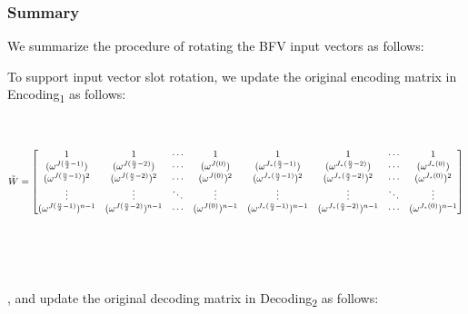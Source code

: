 \subsubsection{Summary}
\label{subsubsec:bfv-rotation-summary}

We summarize the procedure of rotating the BFV input vectors as follows: 

\begin{tcolorbox}[title={\textbf{\tboxlabel{\ref*{subsec:bfv-rotation}} BFV's Homomorphic Rotation of Input Vector Slots}}]

To support input vector slot rotation, we update the original encoding matrix in \textsf{Encoding\textsubscript{1}} as follows: 

$ $

{\footnotesize{\noindent $\tilde{W} = \begin{bmatrix}
1 & 1 & \cdots & 1 & 1 & 1 & \cdots & 1\\
(\omega^{J(\frac{n}{2} - 1)}) & (\omega^{J(\frac{n}{2} - 2)}) & \cdots & (\omega^{J(0)}) & (\omega^{J_*(\frac{n}{2} - 1)}) & (\omega^{J_*(\frac{n}{2} - 2)}) & \cdots & (\omega^{J_*(0)})\\
(\omega^{J(\frac{n}{2} - 1)})^2 & (\omega^{J(\frac{n}{2} - 2)})^2 & \cdots & (\omega^{J(0)})^2 & (\omega^{J_*(\frac{n}{2} - 1)})^2 & (\omega^{J_*(\frac{n}{2} - 2)})^2 & \cdots & (\omega^{J_*(0)})^2 \\
\vdots & \vdots & \ddots & \vdots & \vdots & \vdots & \ddots & \vdots \\
(\omega^{J(\frac{n}{2} - 1)})^{n-1} & (\omega^{J(\frac{n}{2} - 2)})^{n-1} & \cdots & (\omega^{J(0)})^{n-1} & (\omega^{J_*(\frac{n}{2} - 1)})^{n-1} & (\omega^{J_*(\frac{n}{2} - 2)})^{n-1} & \cdots  & (\omega^{J_*(0)})^{n-1}
\end{bmatrix}$}}

$ $

$ $


, and update the original decoding matrix in \textsf{Decoding\textsubscript{2}} as follows:


\end{tcolorbox}
